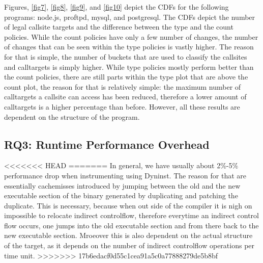 Figures, \ref{fig7}, \ref{fig8}, \ref{fig9}, and \ref{fig10} depict the CDFs for the following programs: node.js, proftpd, mysql, and postgresql.
The CDFs depict the number of legal callsite targets and the difference between the type and the count policies. 
While the count  policies have only a few number of changes, the number of changes 
that can be seen within the type policies is vastly higher. The reason for that is 
simple, the number of buckets that are used to classify the callsites and calltargets 
is simply higher. While type policies mostly perform better than the count policies, 
there are still parts within the type plot that are above the count plot, the reason 
for that is relatively simple: the maximum number of calltargets a callsite can access 
has been reduced, therefore a lower amount of calltargets is a higher percentage than 
before. However, all these results are dependent on the structure of the program.

\subsection{RQ3: Runtime Performance Overhead}
<<<<<<< HEAD
=======
In general, we have usually about 2\%-5\% performance drop when instrumenting using Dyninst. The reason for that are essentially cachemisses introduced by jumping between the old and the new executable section of the binary generated by duplicating and patching the duplicate. This is necessary, because when out side of the compiler it is nigh on impossible to relocate indirect controlflow, therefore everytime an indirect control flow occurs, one jumps into the old executable section and from there back to the new executable section. Mroeover this is also dependent on the actual structure of the target, as it depends on the number of indirect controlflow operations per time unit.
>>>>>>> 17b6edacf0d55c1cea91a5c0a77888279de5b8bf

